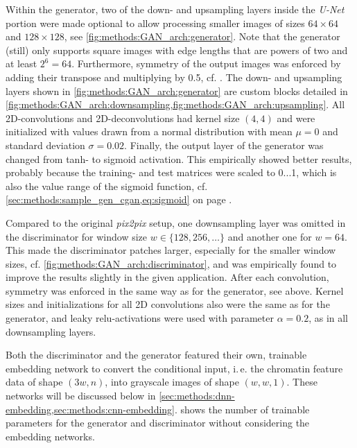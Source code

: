 Within the generator, two of the down- and upsampling layers inside the \emph{U-Net} portion were made optional 
to allow processing smaller images of sizes $64\times64$ and $128\times128$, see \cref{fig:methods:GAN_arch:generator}.
Note that the generator (still) only supports square images with edge lengths that are powers of two and at least $2^6=64$.
Furthermore, symmetry of the output images was enforced by adding their transpose and multiplying by 0.5, cf. \cite{Fudenberg2020}.
The down- and upsampling layers shown in  \cref{fig:methods:GAN_arch:generator} are custom blocks 
detailed in \cref{fig:methods:GAN_arch:downsampling,fig:methods:GAN_arch:upsampling}. 
All 2D-convolutions and 2D-deconvolutions had kernel size $(4,4)$ and were initialized with values drawn from a normal distribution with mean $\mu=0$ and
standard deviation $\sigma=0.02$.
Finally, the output layer of the generator was changed from tanh- to sigmoid activation.
This empirically showed better results, probably because the training- and test matrices were scaled to 0...1, which 
is also the value range of the sigmoid function, cf. \cref{sec:methods:sample_gen_cgan,eq:sigmoid} on page \pageref{eq:sigmoid}.

Compared to the original \emph{pix2pix} setup, 
one downsampling layer was omitted in the discriminator for window size $w\in\{128,256,\dots\}$ and another one for $w=64$.
This made the discriminator patches larger, especially for the smaller window sizes,
cf. \cref{fig:methods:GAN_arch:discriminator}, and was empirically found to improve the results
slightly in the given application.
After each convolution, symmetry was enforced in the same way as for the generator, see above.
Kernel sizes and initializations for all 2D convolutions also were the same as for the generator,
and leaky \acrshort{relu}-activations were used with parameter $\alpha=0.2$, as in all downsampling layers.

Both the discriminator and the generator featured their own, trainable embedding network
to convert the conditional input, i.\,e. the chromatin feature data of shape $(3w, n)$,
into grayscale images of shape $(w,w,1)$. 
These networks will be discussed below in \cref{sec:methods:dnn-embedding,sec:methods:cnn-embedding}.
 shows the number of trainable parameters
for the generator and discriminator without considering the embedding networks.

